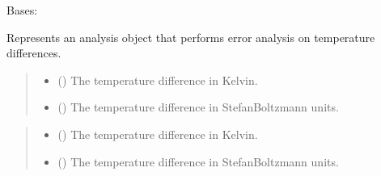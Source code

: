 \documentclass[a4paper,11pt,english,openany]{sphinxmanual}
\begin{document}
\begin{fulllineitems}
\label{\detokenize{api/spyice.postprocess.analysis:spyice.postprocess.analysis.Analysis}}
\pysigstartsignatures
{}
\pysigstopsignatures
\sphinxAtStartPar
Bases: 

\sphinxAtStartPar
Represents an analysis object that performs error analysis on temperature differences.
\begin{quote}\begin{description}
\begin{itemize}
\item {} 
\sphinxAtStartPar
{} () \textendash{} The temperature difference in Kelvin.

\item {} 
\sphinxAtStartPar
{} () \textendash{} The temperature difference in Stefan\sphinxhyphen{}Boltzmann units.

\end{itemize}

\end{description}\end{quote}

\begin{fulllineitems}
\label{\detokenize{api/spyice.postprocess.analysis:spyice.postprocess.analysis.Analysis.__init__}}
\pysigstartsignatures
{}
\pysigstopsignatures\begin{quote}\begin{description}
\begin{itemize}
\item {} 
\sphinxAtStartPar
{} () \textendash{} The temperature difference in Kelvin.

\item {} 
\sphinxAtStartPar
{} () \textendash{} The temperature difference in Stefan\sphinxhyphen{}Boltzmann units.


\end{itemize}
\end{description}
\end{quote}
\end{fulllineitems}
\end{fulllineitems}
\end{document}
